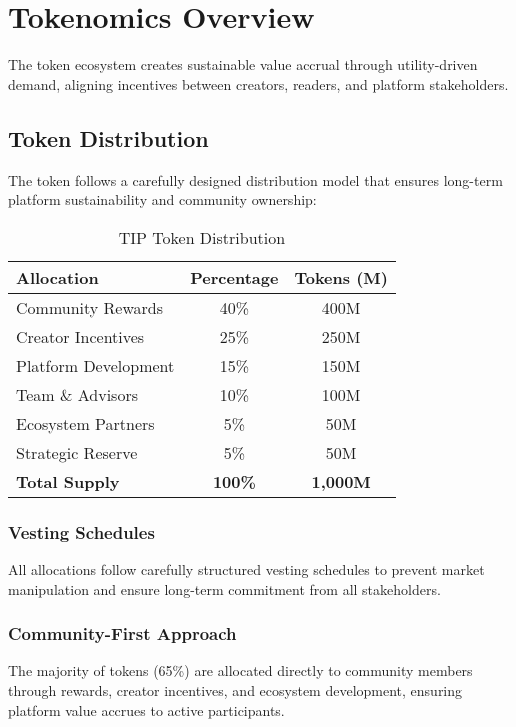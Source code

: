 \section{Tokenomics Overview}
\label{sec:tokenomics-overview}

The \tip{} token ecosystem creates sustainable value accrual through utility-driven demand, aligning incentives between creators, readers, and platform stakeholders.

\subsection{Token Distribution}

The \tip{} token follows a carefully designed distribution model that ensures long-term platform sustainability and community ownership:

\begin{table}[H]
\centering
\caption{TIP Token Distribution}
\label{tab:token-distribution}
\begin{tabular}{@{}lcc@{}}
\toprule
\textbf{Allocation} & \textbf{Percentage} & \textbf{Tokens (M)} \\
\midrule
Community Rewards & 40\% & 400M \\
Creator Incentives & 25\% & 250M \\
Platform Development & 15\% & 150M \\
Team \& Advisors & 10\% & 100M \\
Ecosystem Partners & 5\% & 50M \\
Strategic Reserve & 5\% & 50M \\
\midrule
\textbf{Total Supply} & \textbf{100\%} & \textbf{1,000M} \\
\bottomrule
\end{tabular}
\end{table}

\subsubsection{Vesting Schedules}

All allocations follow carefully structured vesting schedules to prevent market manipulation and ensure long-term commitment from all stakeholders.

\subsubsection{Community-First Approach}

The majority of tokens (65\%) are allocated directly to community members through rewards, creator incentives, and ecosystem development, ensuring platform value accrues to active participants.

